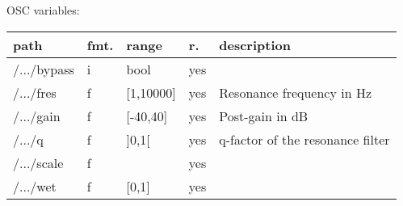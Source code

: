 \begin{snugshade}
{\footnotesize
\label{osctab:tascarapspksim}
OSC variables:
\nopagebreak

\begin{tabularx}{\textwidth}{llllX}
\hline
path & fmt. & range & r. & description\\
\hline
/.../bypass & i & bool & yes & \\
/.../fres & f & [1,10000] & yes & Resonance frequency in Hz\\
/.../gain & f & [-40,40] & yes & Post-gain in dB\\
/.../q & f & ]0,1[ & yes & q-factor of the resonance filter\\
/.../scale & f &  & yes & \\
/.../wet & f & [0,1] & yes & \\
\hline
\end{tabularx}
}
\end{snugshade}
